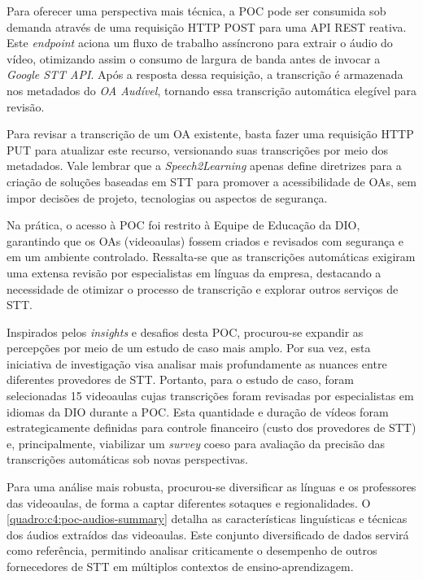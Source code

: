 Para oferecer uma perspectiva mais técnica, a POC pode ser consumida sob demanda através de uma requisição HTTP POST para uma API REST reativa. Este \textit{endpoint} aciona um fluxo de trabalho assíncrono para extrair o áudio do vídeo, otimizando assim o consumo de largura de banda antes de invocar a \textit{Google STT API}. Após a resposta dessa requisição, a transcrição é armazenada nos metadados do \textit{OA Audível}, tornando essa transcrição automática elegível para revisão.

Para revisar a transcrição de um OA existente, basta fazer uma requisição HTTP PUT para atualizar este recurso, versionando suas transcrições por meio dos metadados. Vale lembrar que a \textit{Speech2Learning} apenas define diretrizes para a criação de soluções baseadas em STT para promover a acessibilidade de OAs, sem impor decisões de projeto, tecnologias ou aspectos de segurança.

Na prática, o acesso à POC foi restrito à Equipe de Educação da DIO, garantindo que os OAs (videoaulas) fossem criados e revisados com segurança e em um ambiente controlado. Ressalta-se que as transcrições automáticas exigiram uma extensa revisão por especialistas em línguas da empresa, destacando a necessidade de otimizar o processo de transcrição e explorar outros serviços de STT.

Inspirados pelos \textit{insights} e desafios desta POC, procurou-se expandir as percepções por meio de um estudo de caso mais amplo. Por sua vez, esta iniciativa de investigação visa analisar mais profundamente as nuances entre diferentes provedores de STT. Portanto, para o estudo de caso, foram selecionadas 15 videoaulas cujas transcrições foram revisadas por especialistas em idiomas da DIO durante a POC. Esta quantidade e duração de vídeos foram estrategicamente definidas para controle financeiro (custo dos provedores de STT) e, principalmente, viabilizar um \textit{survey} coeso para avaliação da precisão das transcrições automáticas sob novas perspectivas.

Para uma análise mais robusta, procurou-se diversificar as línguas e os professores das videoaulas, de forma a captar diferentes sotaques e regionalidades. O \autoref{quadro:c4:poc-audios-summary} detalha as características linguísticas e técnicas dos áudios extraídos das videoaulas. Este conjunto diversificado de dados servirá como referência, permitindo analisar criticamente o desempenho de outros fornecedores de STT em múltiplos contextos de ensino-aprendizagem.

